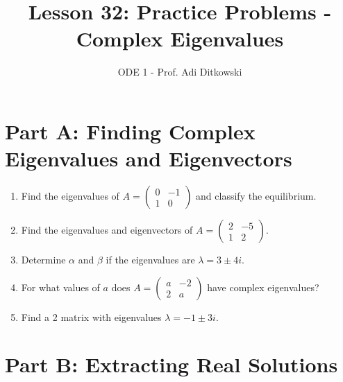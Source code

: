 \documentclass[12pt]{article}
\title{Lesson 32: Practice Problems - Complex Eigenvalues}
\author{ODE 1 - Prof. Adi Ditkowski}
\date{}
\begin{document}
\maketitle

\section*{Part A: Finding Complex Eigenvalues and Eigenvectors}

\begin{enumerate}
\item Find the eigenvalues of $A = \begin{pmatrix} 0 & -1 \\ 1 & 0 \end{pmatrix}$ and classify the equilibrium.

\item Find the eigenvalues and eigenvectors of $A = \begin{pmatrix} 2 & -5 \\ 1 & 2 \end{pmatrix}$.

\item Determine $\alpha$ and $\beta$ if the eigenvalues are $\lambda = 3 \pm 4i$.

\item For what values of $a$ does $A = \begin{pmatrix} a & -2 \\ 2 & a \end{pmatrix}$ have complex eigenvalues?

\item Find a 2 matrix with eigenvalues $\lambda = -1 \pm 3i$.
\end{enumerate}

\section*{Part B: Extracting Real Solutions}
\end{document}
